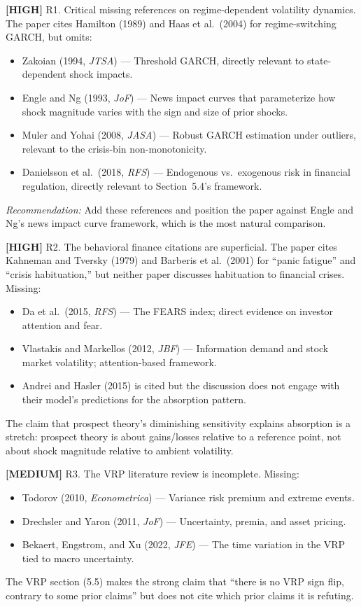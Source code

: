 \documentclass[12pt,a4paper]{article}
\newcommand{\high}[1]{\textcolor{errorred}{\textbf{[HIGH]} #1}}
\newcommand{\med}[1]{\textcolor{warncolor}{\textbf{[MEDIUM]} #1}}
\begin{document}
\high{R1. Critical missing references on regime-dependent volatility dynamics.} The paper cites Hamilton (1989) and Haas et al.\ (2004) for regime-switching GARCH, but omits:
\begin{itemize}[nosep]
\item Zakoian (1994, \textit{JTSA}) --- Threshold GARCH, directly relevant to state-dependent shock impacts.
\item Engle and Ng (1993, \textit{JoF}) --- News impact curves that parameterize how shock magnitude varies with the sign and size of prior shocks.
\item Muler and Yohai (2008, \textit{JASA}) --- Robust GARCH estimation under outliers, relevant to the crisis-bin non-monotonicity.
\item Danielsson et al.\ (2018, \textit{RFS}) --- Endogenous vs.\ exogenous risk in financial regulation, directly relevant to Section~5.4's framework.
\end{itemize}
\emph{Recommendation:} Add these references and position the paper against Engle and Ng's news impact curve framework, which is the most natural comparison.

\high{R2. The behavioral finance citations are superficial.} The paper cites Kahneman and Tversky (1979) and Barberis et al.\ (2001) for ``panic fatigue'' and ``crisis habituation,'' but neither paper discusses habituation to financial crises. Missing:
\begin{itemize}[nosep]
\item Da et al.\ (2015, \textit{RFS}) --- The FEARS index; direct evidence on investor attention and fear.
\item Vlastakis and Markellos (2012, \textit{JBF}) --- Information demand and stock market volatility; attention-based framework.
\item Andrei and Hasler (2015) is cited but the discussion does not engage with their model's predictions for the absorption pattern.
\end{itemize}
The claim that prospect theory's diminishing sensitivity explains absorption is a stretch: prospect theory is about gains/losses relative to a reference point, not about shock magnitude relative to ambient volatility.

\med{R3. The VRP literature review is incomplete.} Missing:
\begin{itemize}[nosep]
\item Todorov (2010, \textit{Econometrica}) --- Variance risk premium and extreme events.
\item Drechsler and Yaron (2011, \textit{JoF}) --- Uncertainty, premia, and asset pricing.
\item Bekaert, Engstrom, and Xu (2022, \textit{JFE}) --- The time variation in the VRP tied to macro uncertainty.
\end{itemize}
The VRP section (5.5) makes the strong claim that ``there is no VRP sign flip, contrary to some prior claims'' but does not cite which prior claims it is refuting.
\end{document}
